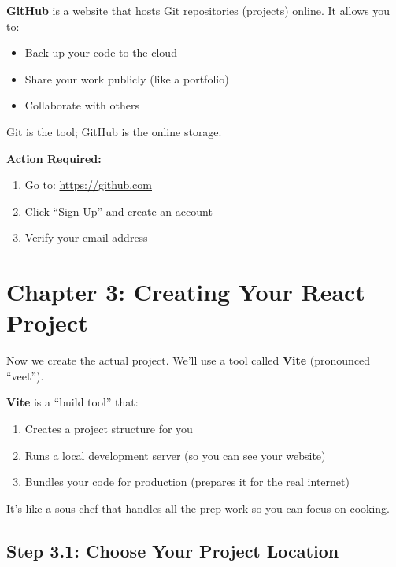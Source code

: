 \documentclass[12pt,a4paper]{article}
\begin{document}
\begin{concept}
\textbf{GitHub} is a website that hosts Git repositories (projects) online. It allows you to:
\begin{itemize}
    \item Back up your code to the cloud
    \item Share your work publicly (like a portfolio)
    \item Collaborate with others
\end{itemize}
Git is the tool; GitHub is the online storage.
\end{concept}

\textbf{Action Required:}
\begin{enumerate}
    \item Go to: \url{https://github.com}
    \item Click ``Sign Up'' and create an account
    \item Verify your email address
\end{enumerate}

\section{Chapter 3: Creating Your React Project}

Now we create the actual project. We'll use a tool called \textbf{Vite} (pronounced ``veet'').

\begin{concept}
\textbf{Vite} is a ``build tool'' that:
\begin{enumerate}
    \item Creates a project structure for you
    \item Runs a local development server (so you can see your website)
    \item Bundles your code for production (prepares it for the real internet)
\end{enumerate}
It's like a sous chef that handles all the prep work so you can focus on cooking.
\end{concept}

\subsection{Step 3.1: Choose Your Project Location}
\end{document}
